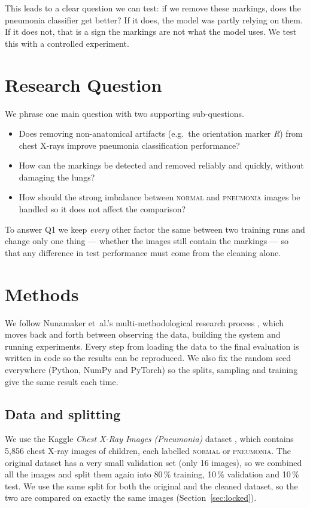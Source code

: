 \documentclass[10pt,twocolumn]{article}
\begin{document}
This leads to a clear question we can test: if we remove these markings, does the
pneumonia classifier get better? If it does, the model was partly relying on
them. If it does not, that is a sign the markings are not what the model uses. We
test this with a controlled experiment.

\section{Research Question}
\label{sec:rq}
We phrase one main question with two supporting sub-questions.

\begin{itemize}
  \item[\textbf{Q1}] Does removing non-anatomical artifacts (e.g.\ the orientation
  marker \emph{R}) from chest X-rays improve pneumonia classification
  performance?
  \item[\textbf{Q1.1}] How can the markings be detected and removed reliably and
  quickly, without damaging the lungs?
  \item[\textbf{Q1.2}] How should the strong imbalance between \textsc{normal} and
  \textsc{pneumonia} images be handled so it does not affect the comparison?
\end{itemize}

\noindent
To answer Q1 we keep \emph{every} other factor the same between two training runs
and change only one thing --- whether the images still contain the markings --- so
that any difference in test performance must come from the cleaning alone.

\section{Methods}
\label{sec:methods}
We follow Nunamaker et~al.'s multi-methodological research process
\cite{nunamaker1990}, which moves back and forth between observing the data,
building the system and running experiments. Every step from loading the data to
the final evaluation is written in code so the results can be reproduced. We also
fix the random seed everywhere (Python, NumPy and PyTorch) so the splits,
sampling and training give the same result each time.

\subsection{Data and splitting}
\label{sec:data}
We use the Kaggle \emph{Chest X-Ray Images (Pneumonia)} dataset
\cite{kermany2018,kagglecxr}, which contains 5{,}856 chest X-ray images of
children, each labelled \textsc{normal} or \textsc{pneumonia}. The original
dataset has a very small validation set (only 16 images), so we combined all the
images and split them again into 80\,\% training, 10\,\% validation and 10\,\%
test. We use the same split for both the original and the cleaned dataset, so the
two are compared on exactly the same images (Section~\ref{sec:locked}).
\end{document}
